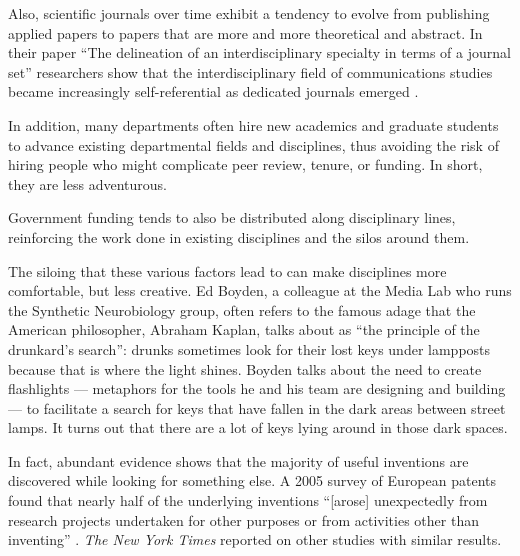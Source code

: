 Also, scientific journals over time exhibit a tendency to evolve from publishing applied papers to papers that are more and more theoretical and abstract. In their paper ``The delineation of an interdisciplinary specialty in terms of a journal set'' researchers show that the interdisciplinary field of communications studies became increasingly self-referential as dedicated journals emerged \cite{leydesdorff2009delineation}.

In addition, many departments often hire new academics and graduate students to advance existing departmental fields and disciplines, thus avoiding the risk of hiring people who might complicate peer review, tenure, or funding. In short, they are less adventurous.

Government funding tends to also be distributed along disciplinary lines, reinforcing the work done in existing disciplines and the silos around them.

The siloing that these various factors lead to can make disciplines more comfortable, but less creative. Ed Boyden, a colleague at the Media Lab who runs the Synthetic Neurobiology group, often refers to the famous adage that the American philosopher, Abraham Kaplan, talks about as ``the principle of the drunkard's search'': \cite{kaplan2017conduct} drunks sometimes look for their lost keys under lampposts because that is where the light shines. Boyden talks about the need to create flashlights --- metaphors for the tools he and his team are designing and building --- to facilitate a search for keys that have fallen in the dark areas between street lamps. It turns out that there are a lot of keys lying around in those dark spaces.

In fact, abundant evidence shows that the majority of useful inventions are discovered while looking for something else. A 2005 survey of European patents \cite{gambardella_value_2008} found that nearly half of the underlying inventions ``[arose] unexpectedly from research projects undertaken for other purposes or from activities other than inventing'' \cite{kennedy_opinion_2016}. \emph{The New York Times} reported on other studies with similar results.

